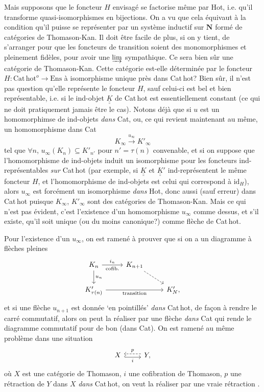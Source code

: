 \documentclass[11pt]{article}
\newcommand{\printedpage}[1]{\marginpar{\footnotesize p.~#1}}
\newcommand{\msp}[1]{\marginpar{\footnotesize [#1]}}
\newcommand{\Cathot}{\mathrm{Cat\,hot}}
\newcommand{\uuK}{\underline{\underline{K}}}
\newcommand{\Ens}{\mathrm{Ens}}
\begin{document}
Mais supposons que le foncteur $H$ envisagé se factorise même par Hot, i.e. qu'il transforme quasi-isomorphismes en bijections. On a vu que cela équivaut à la condition qu'il puisse se représenter par un système inductif sur $\mathbf{N}$ formé de catégories de Thomason-Kan. Il doit être facile de plus, si on y tient, de s'arranger pour que les foncteurs de transition soient des monomorphismes et pleinement fidèles, pour avoir une $\varinjlim$ sympathique. Ce sera bien sûr une catégorie de Thomason-Kan. Cette catégorie est-elle déterminée par le foncteur $H : \Cathot^{o} \longrightarrow \Ens$ à isomorphisme unique près dans Cat\,hot? Bien sûr, il n'est pas question qu'elle représente le foncteur $H$, sauf celui-ci est bel et bien représentable, i.e. si le ind-objet $\uuK$ de Cat\,hot est essentiellement constant (ce qui ne doit pratiquement jamais être le cas). Notons déjà
\printedpage{30}
\msp{page 47}
que si $u$ est un homomorphimse de ind-objets \textit{dans} Cat, ou, ce qui revient maintenant au même, un homomorphisme dans Cat %
\[
K_\infty \xrightarrow{u_\infty} K'_\infty
\]
tel que $\forall n$, $u_\infty(K_n) \subseteq K'_{n'}$ pour $n' = \tau(n)$ convenable, et si on suppose que l'homomorphisme de ind-objets induit un isomorphisme pour les foncteurs ind-représentables \textit{sur} Cat\,hot (par exemple, si $\uuK$ et $\uuK'$ ind-représentent le même foncteur $H$, et l'homomorphisme de ind-objets est celui qui correspond à $\mathrm{id}_H$), alors $u_\infty$ est forcément un isomorphisme \textit{dans} Hot, donc aussi (sauf erreur) dans Cat\,hot puisque $K_\infty$, $K'_\infty$ sont des catégories de Thomason-Kan. Mais ce qui n'est pas évident, c'est l'existence d'un homomorphisme $u_\infty$ comme dessus, et s'il existe, qu'il soit unique (ou du moins canonique?) comme flèche de Cat\,hot.

Pour l'existence d'un $u_\infty$, on est ramené à prouver que si on a un diagramme à flèches pleines
\[
\begin{tikzcd}
K_n \arrow[r, "i_n", "\text{cofib.}"'] \arrow[d, "u_n"] & K_{n+1} \arrow[dr, dashed] & \\
K'_{\tau(n)} \arrow[rr, "\text{transition}"'] & & K'_N ,
\end{tikzcd}
\]
et si une flèche $u_{n+1}$ est donnée `en pointillés' \textit{dans} Cat\,hot, de façon à rendre le carré commutatif,
\msp{page 48}
alors on peut la réaliser par une flèche \textit{dans} Cat qui rende le diagramme commutatif pour de bon (dans Cat). On est ramené au même problème dans une situation
\[
\begin{tikzcd}
X \arrow[r, hook, shift right, "i"'] & Y , \arrow[l, dashed, shift right, "p"']
\end{tikzcd}
\]
où $X$ est une catégorie de Thomason, $i$ une cofibration de Thomason, $p$ une rétraction de $Y$ dans $X$ \textit{dans} Cat\,hot, on veut la réaliser par une vraie rétraction .
\end{document}
